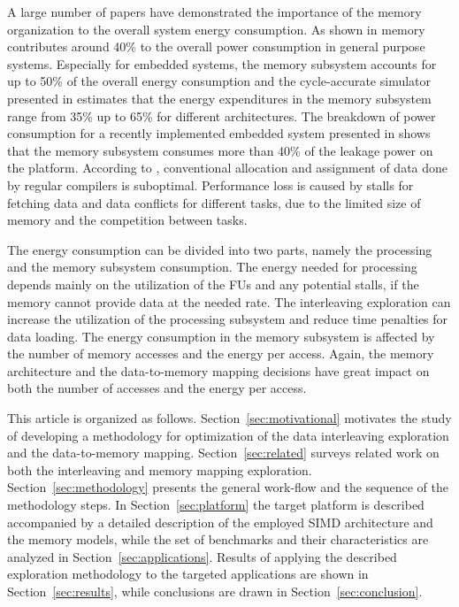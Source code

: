 \documentclass[prodmode,acmtecs]{acmsmall}
\begin{document}
A large number of papers have demonstrated the importance of the memory organization to the overall system energy consumption. 
As shown in \cite{Gonzalez1996} memory contributes around 40\% to the overall power consumption in general purpose systems. 
Especially for embedded systems, the memory subsystem accounts for up to 50\% of the overall energy consumption \cite{Che09} and the cycle-accurate simulator presented in \cite{Ben99} estimates that the energy expenditures in the memory subsystem range from 35\% up to 65\% for different architectures. 
The breakdown of power consumption for a recently implemented embedded system presented in \cite{Hul11} shows that the memory subsystem consumes more than 40\% of the leakage power on the platform. 
According to \cite{tcm}, conventional allocation and assignment of data done by regular compilers is suboptimal. 
Performance loss is caused by stalls for fetching data and data conflicts for different tasks, due to the limited size of memory and the competition between tasks. 

The energy consumption can be divided into two parts, namely the processing and the memory subsystem consumption.  
The energy needed for processing depends mainly on the utilization of the FUs and any potential stalls, if the memory cannot provide data at the needed rate.
The interleaving exploration can increase the utilization of the processing subsystem and reduce time penalties for data loading.   
The energy consumption in the memory subsystem is affected by the number of memory accesses and the energy per access. 
Again, the memory architecture and the data-to-memory mapping decisions have great impact on both the number of accesses and the energy per access.

This article is organized as follows. 
Section~\ref{sec:motivational} motivates the study of developing a methodology for optimization of the data interleaving exploration and the data-to-memory mapping. 
Section~\ref{sec:related} surveys related work on both the interleaving and memory mapping exploration.
Section~\ref{sec:methodology} presents the general work-flow and the sequence of the methodology steps.
In Section~\ref{sec:platform} the target platform is described accompanied by a detailed description of the employed SIMD architecture and the memory models, while the set of benchmarks and their characteristics are analyzed in Section~\ref{sec:applications}. 
Results of applying the described exploration methodology to the targeted applications are shown in Section~\ref{sec:results}, while conclusions are drawn in Section~\ref{sec:conclusion}. 
\end{document}
